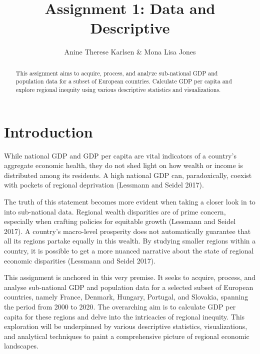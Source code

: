 \documentclass[
  a4paper,
  DIV=11,
  numbers=noendperiod]{scrartcl}
\title{Assignment 1: Data and Descriptive}
\author{Anine Therese Karlsen \& Mona Lisa Jones}
\date{}
\begin{document}
\maketitle
\begin{abstract}
This assignment aims to acquire, process, and analyze sub-national GDP
and population data for a subset of European countries. Calculate GDP
per capita and explore regional inequity using various descriptive
statistics and visualizations.
\end{abstract}
\ifdefined\Shaded\renewenvironment{Shaded}{\begin{tcolorbox}[sharp corners, interior hidden, frame hidden, borderline west={3pt}{0pt}{shadecolor}, boxrule=0pt, enhanced, breakable]}{\end{tcolorbox}}\fi

\hypertarget{introduction}{%
\section{Introduction}\label{introduction}}

While national GDP and GDP per capita are vital indicators of a
country's aggregate economic health, they do not shed light on how
wealth or income is distributed among its residents. A high national GDP
can, paradoxically, coexist with pockets of regional deprivation
(Lessmann and Seidel 2017).

The truth of this statement becomes more evident when taking a closer
look in to into sub-national data. Regional wealth disparities are of
prime concern, especially when crafting policies for equitable growth
(Lessmann and Seidel 2017). A country's macro-level prosperity does not
automatically guarantee that all its regions partake equally in this
wealth. By studying smaller regions within a country, it is possible to
get a more nuanced narrative about the state of regional economic
disparities (Lessmann and Seidel 2017).

This assignment is anchored in this very premise. It seeks to acquire,
process, and analyse sub-national GDP and population data for a selected
subset of European countries, namely France, Denmark, Hungary, Portugal,
and Slovakia, spanning the period from 2000 to 2020. The overarching aim
is to calculate GDP per capita for these regions and delve into the
intricacies of regional inequity. This exploration will be underpinned
by various descriptive statistics, visualizations, and analytical
techniques to paint a comprehensive picture of regional economic
landscapes.
\end{document}
